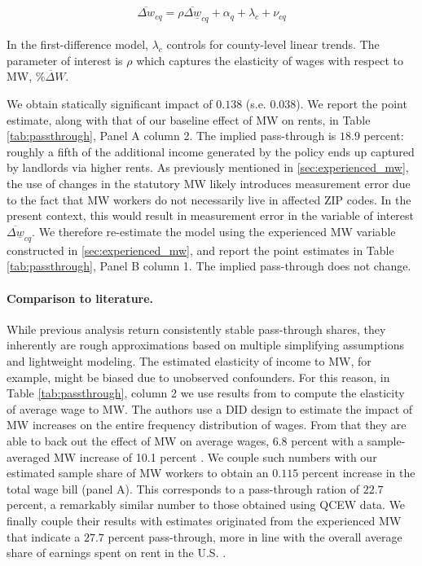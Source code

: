 \begin{align}
	\overline{\Delta w}_{cq} = \rho \overline{\Delta \underline{w}}_{cq} + \alpha_{q} + \lambda_{c} + \nu_{cq}
\end{align}

In the first-difference model, $\lambda_{c}$ controls for county-level linear trends. 
The parameter of interest is $\rho$ which captures the elasticity of wages with respect to 
MW, $\overline{\% \Delta W}$. 

We obtain statically significant impact of $0.138$ (s.e. $0.038$). 
We report the point estimate, along with that of our baseline effect of MW on rents, in 
Table \ref{tab:passthrough}, Panel A column 2. The implied pass-through is $18.9$ percent: 
roughly a fifth of the additional income generated by the policy ends up captured by landlords 
via higher rents. As previously mentioned in \autoref{sec:experienced_mw}, the use of changes in the statutory 
MW likely introduces measurement error due to the fact that MW workers do not necessarily 
live in affected ZIP codes. In the present context, this would result in measurement error in 
the variable of interest $\overline{\Delta \underline{w}}_{cq}$. We therefore re-estimate the model 
using the experienced MW variable constructed in \autoref{sec:experienced_mw}, and report the point 
estimates in Table \ref{tab:passthrough}, Panel B column 1. The implied pass-through does not
change. \\

\paragraph{Comparison to literature.} While previous analysis return consistently stable 
pass-through shares, they inherently are rough approximations based on multiple simplifying 
assumptions and lightweight modeling. The estimated elasticity of income to MW, for example, 
might be biased due to unobserved confounders. For this reason, in Table \ref{tab:passthrough}, 
column 2 we use results from \textcite{CegnizEtAl2019} to compute the elasticity of 
average wage to MW. The authors use a DID design to estimate the impact of 
MW increases on the entire frequency distribution of wages. From that they are able to back out the effect of 
MW on average wages, 6.8 percent with a sample-averaged MW increase of 10.1 percent 
\parencite[Table I]{CegnizEtAl2019}. We couple such numbers with our estimated sample share 
of MW workers to obtain an $0.115$ percent increase in the total wage bill (panel A). This corresponds to 
a pass-through ration of $22.7$ percent, a remarkably similar number to those obtained using 
QCEW data. We finally couple their results with estimates originated from the experienced MW that
indicate a $27.7$ percent pass-through, more in line with the 
overall average share of earnings spent on rent in the U.S. \parencite{fernald2020americas}.   

